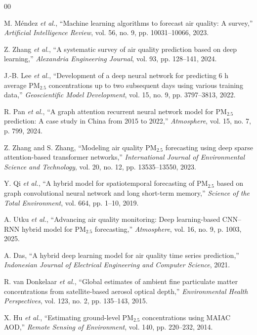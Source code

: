 \documentclass[conference]{IEEEtran}
\begin{document}
\begin{thebibliography}{00}

M. Méndez \textit{et al.}, “Machine learning algorithms to forecast air quality: A survey,” 
\textit{Artificial Intelligence Review}, vol. 56, no. 9, pp. 10031–10066, 2023.

Z. Zhang \textit{et al.}, “A systematic survey of air quality prediction based on deep learning,” 
\textit{Alexandria Engineering Journal}, vol. 93, pp. 128–141, 2024.

J.-B. Lee \textit{et al.}, “Development of a deep neural network for predicting 6 h average PM$_{2.5}$ concentrations up to two subsequent days using various training data,” 
\textit{Geoscientific Model Development}, vol. 15, no. 9, pp. 3797–3813, 2022.

R. Pan \textit{et al.}, “A graph attention recurrent neural network model for PM$_{2.5}$ prediction: A case study in China from 2015 to 2022,” 
\textit{Atmosphere}, vol. 15, no. 7, p. 799, 2024.

Z. Zhang and S. Zhang, “Modeling air quality PM$_{2.5}$ forecasting using deep sparse attention-based transformer networks,” 
\textit{International Journal of Environmental Science and Technology}, vol. 20, no. 12, pp. 13535–13550, 2023.

Y. Qi \textit{et al.}, “A hybrid model for spatiotemporal forecasting of PM$_{2.5}$ based on graph convolutional neural network and long short-term memory,” 
\textit{Science of the Total Environment}, vol. 664, pp. 1–10, 2019.

A. Utku \textit{et al.}, “Advancing air quality monitoring: Deep learning-based CNN–RNN hybrid model for PM$_{2.5}$ forecasting,” 
\textit{Atmosphere}, vol. 16, no. 9, p. 1003, 2025.

A. Das, “A hybrid deep learning model for air quality time series prediction,” 
\textit{Indonesian Journal of Electrical Engineering and Computer Science}, 2021.

R. van Donkelaar \textit{et al.}, “Global estimates of ambient fine particulate matter concentrations from satellite-based aerosol optical depth,” 
\textit{Environmental Health Perspectives}, vol. 123, no. 2, pp. 135–143, 2015.

X. Hu \textit{et al.}, “Estimating ground-level PM$_{2.5}$ concentrations using MAIAC AOD,” 
\textit{Remote Sensing of Environment}, vol. 140, pp. 220–232, 2014.


\end{thebibliography}
\end{document}
